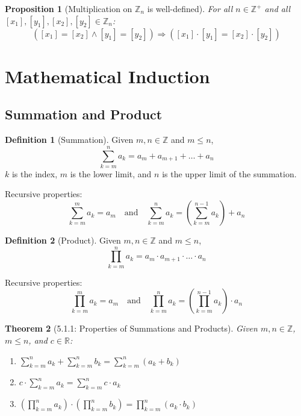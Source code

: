 \documentclass{article}
\theoremstyle{plain}
\newtheorem{theorem}{Theorem}[section]
\newtheorem{proposition}[theorem]{Proposition}
\theoremstyle{definition}
\newtheorem*{definition}{Definition}
\theoremstyle{remark}
\begin{document}
\begin{proposition}[Multiplication on $\mathbb{Z}_n$ is well-defined]
    For all $n \in \mathbb{Z}^+$ and all $[x_1], [y_1], [x_2], [y_2] \in \mathbb{Z}_n$:
    \[ ([x_1] = [x_2] \wedge [y_1] = [y_2]) \Rightarrow ([x_1] \cdot [y_1] = [x_2] \cdot [y_2]) \]
\end{proposition}

\newpage

\section{Mathematical Induction}

\subsection{Summation and Product}

\begin{definition}[Summation]
    Given $m, n \in \mathbb{Z}$ and $m \leq n$,
    \[ \sum_{k=m}^{n} a_k = a_m + a_{m+1} + \dots + a_n \]
    $k$ is the index, $m$ is the lower limit, and $n$ is the upper limit of the summation.
    
    Recursive properties:
    \[ \sum_{k=m}^{m} a_k = a_m \quad \text{and} \quad \sum_{k=m}^{n} a_k = \left(\sum_{k=m}^{n-1} a_k\right) + a_n \]
\end{definition}

\begin{definition}[Product]
    Given $m, n \in \mathbb{Z}$ and $m \leq n$,
    \[ \prod_{k=m}^{n} a_k = a_m \cdot a_{m+1} \cdot \dots \cdot a_n \]
    
    Recursive properties:
    \[ \prod_{k=m}^{m} a_k = a_m \quad \text{and} \quad \prod_{k=m}^{n} a_k = \left(\prod_{k=m}^{n-1} a_k\right) \cdot a_n \]
\end{definition}

\begin{theorem}[5.1.1: Properties of Summations and Products]
    Given $m, n \in \mathbb{Z}$, $m \leq n$, and $c \in \mathbb{R}$:
    \begin{enumerate}[label=\arabic*.]
        \item $\displaystyle \sum_{k=m}^{n} a_k + \sum_{k=m}^{n} b_k = \sum_{k=m}^{n} (a_k + b_k)$
        \item $\displaystyle c \cdot \sum_{k=m}^{n} a_k = \sum_{k=m}^{n} c \cdot a_k$
        \item $\displaystyle \left(\prod_{k=m}^{n} a_k\right) \cdot \left(\prod_{k=m}^{n} b_k\right) = \prod_{k=m}^{n} (a_k \cdot b_k)$
    \end{enumerate}
\end{theorem}
\end{document}
